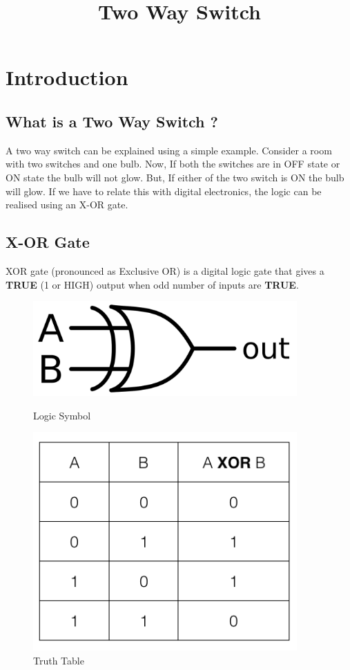 \documentclass[12pt]{article}
\title{Two Way Switch}
\begin{document}
\newpage
\tableofcontents
\newpage
\section{Introduction}

\subsection{What is a Two Way Switch ?}
A two way switch can be explained using a simple example. Consider a room with two switches and one bulb. Now, If both the switches are in OFF state or ON state the bulb will not glow. But, If either of the two switch is ON the bulb will glow. If we have to relate this with digital electronics, the logic can be realised using an X-OR gate.

\subsection{X-OR Gate}
XOR gate (pronounced as Exclusive OR) is a digital logic gate that gives a \textbf{TRUE} (1 or HIGH) output when odd number of inputs are \textbf{TRUE}. 

\begin{figure}[H]
    \centering
    \begin{minipage}{0.45\textwidth}
        \centering
        \includegraphics[width=0.9\textwidth]{img1} 
        \caption{Logic Symbol}
    \end{minipage}\hfill
    \begin{minipage}{0.45\textwidth}
        \centering
        \includegraphics[width=0.9\textwidth]{img2} 
        \caption{Truth Table}
    \end{minipage}
\end{figure}
\end{document}
